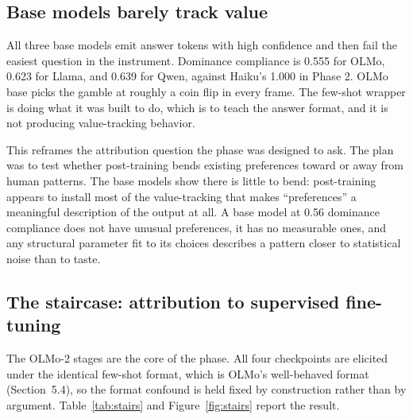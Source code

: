 \documentclass[11pt]{article}
\begin{document}
\subsection{Base models barely track value}
All three base models emit answer tokens with high confidence and then fail the easiest question in the
instrument. Dominance compliance is 0.555 for OLMo, 0.623 for Llama, and 0.639 for Qwen, against
Haiku's 1.000 in Phase 2. OLMo base picks the gamble at roughly a coin flip in every frame. The few-shot
wrapper is doing what it was built to do, which is to teach the answer format, and it is not producing
value-tracking behavior.

This reframes the attribution question the phase was designed to ask. The plan was to test whether
post-training bends existing preferences toward or away from human patterns. The base models show there
is little to bend: post-training appears to install most of the value-tracking that makes
``preferences'' a meaningful description of the output at all. A base model at 0.56 dominance
compliance does not have unusual preferences, it has no measurable ones, and any structural parameter
fit to its choices describes a pattern closer to statistical noise than to taste.

\subsection{The staircase: attribution to supervised fine-tuning}
The OLMo-2 stages are the core of the phase. All four checkpoints are elicited under the identical
few-shot format, which is OLMo's well-behaved format (Section~5.4), so the format confound is held fixed
by construction rather than by argument. Table~\ref{tab:stairs} and Figure~\ref{fig:stairs} report the
result.
\end{document}
